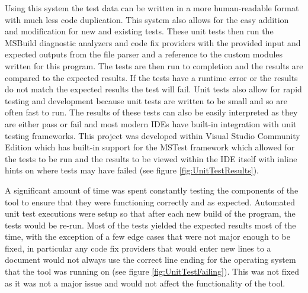 Using this system the test data can be written in a more human-readable format with much less code duplication. This system also allows for the easy addition and modification for new and existing tests. These unit tests then run the MSBuild diagnostic analyzers and code fix providers with the provided input and expected outputs from the file parser and a reference to the custom modules written for this program. The tests are then run to completion and the results are compared to the expected results. If the tests have a runtime error or the results do not match the expected results the test will fail.
Unit tests also allow for rapid testing and development because unit tests are written to be small and so are often fast to run. The results of these tests can also be easily interpreted as they are either pass or fail and most modern IDEs have built-in integration with unit testing frameworks. This project was developed within Visual Studio Community Edition which has built-in support for the MSTest framework which allowed for the tests to be run and the results to be viewed within the IDE itself with inline hints on where tests may have failed (see figure \ref{fig:UnitTestResults}).

A significant amount of time was spent constantly testing the components of the tool to ensure that they were functioning correctly and as expected. Automated unit test executions were setup so that after each new build of the program, the tests would be re-run. Most of the tests yielded the expected results most of the time, with the exception of a few edge cases that were not major enough to be fixed, in particular any code fix providers that would enter new lines to a document would not always use the correct line ending for the operating system that the tool was running on (see figure \ref{fig:UnitTestFailing}). This was not fixed as it was not a major issue and would not affect the functionality of the tool.


